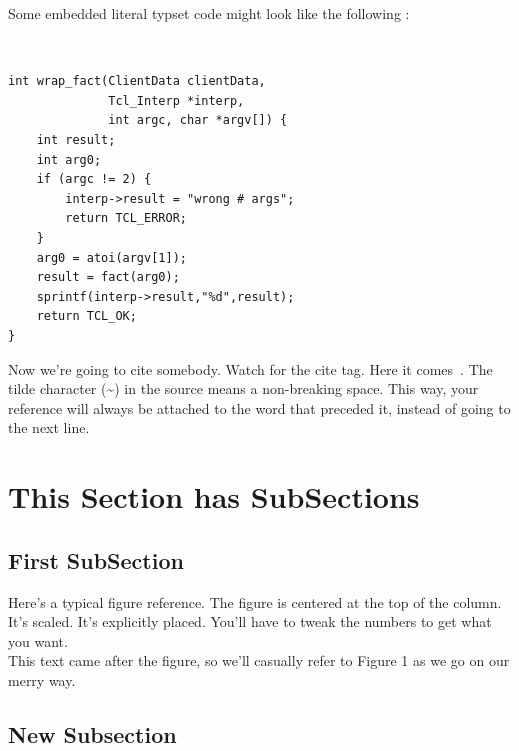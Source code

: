 \documentclass[letterpaper,twocolumn,10pt]{article}
\begin{document}
Some embedded literal typset code might 
look like the following :


{\tt \small
\begin{verbatim}
int wrap_fact(ClientData clientData,
              Tcl_Interp *interp,
              int argc, char *argv[]) {
    int result;
    int arg0;
    if (argc != 2) {
        interp->result = "wrong # args";
        return TCL_ERROR;
    }
    arg0 = atoi(argv[1]);
    result = fact(arg0);
    sprintf(interp->result,"%d",result);
    return TCL_OK;
}
\end{verbatim}
}

Now we're going to cite somebody.  Watch for the cite tag.
Here it comes~\cite{Chaum1981,Diffie1976}.  The tilde character (\~{})
in the source means a non-breaking space.  This way, your reference will
always be attached to the word that preceded it, instead of going to the
next line.

\section{This Section has SubSections}
\subsection{First SubSection}

Here's a typical figure reference.  The figure is centered at the
top of the column.  It's scaled.  It's explicitly placed.  You'll
have to tweak the numbers to get what you want.\\



This text came after the figure, so we'll casually refer to Figure 1
as we go on our merry way.

\subsection{New Subsection}
\end{document}
